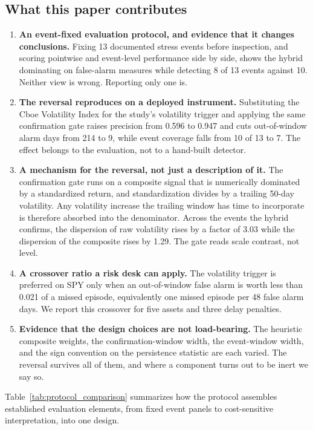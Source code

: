\documentclass[pdflatex,sn-mathphys-num,iicol]{sn-jnl}
\begin{document}
\subsection*{What this paper contributes}
\begin{enumerate}
\item \textbf{An event-fixed evaluation protocol, and evidence that it changes conclusions.} Fixing 13 documented stress events before inspection, and scoring pointwise and event-level performance side by side, shows the hybrid dominating on false-alarm measures while detecting 8 of 13 events against 10. Neither view is wrong. Reporting only one is.
\item \textbf{The reversal reproduces on a deployed instrument.} Substituting the Cboe Volatility Index for the study's volatility trigger and applying the same confirmation gate raises precision from 0.596 to 0.947 and cuts out-of-window alarm days from 214 to 9, while event coverage falls from 10 of 13 to 7. The effect belongs to the evaluation, not to a hand-built detector.
\item \textbf{A mechanism for the reversal, not just a description of it.} The confirmation gate runs on a composite signal that is numerically dominated by a standardized return, and standardization divides by a trailing 50-day volatility. Any volatility increase the trailing window has time to incorporate is therefore absorbed into the denominator. Across the events the hybrid confirms, the dispersion of raw volatility rises by a factor of 3.03 while the dispersion of the composite rises by 1.29. The gate reads scale contrast, not level.
\item \textbf{A crossover ratio a risk desk can apply.} The volatility trigger is preferred on SPY only when an out-of-window false alarm is worth less than 0.021 of a missed episode, equivalently one missed episode per 48 false alarm days. We report this crossover for five assets and three delay penalties.
\item \textbf{Evidence that the design choices are not load-bearing.} The heuristic composite weights, the confirmation-window width, the event-window width, and the sign convention on the persistence statistic are each varied. The reversal survives all of them, and where a component turns out to be inert we say so.
\end{enumerate}

Table~\ref{tab:protocol_comparison} summarizes how the protocol assembles established evaluation elements, from fixed event panels to cost-sensitive interpretation, into one design.
\end{document}
